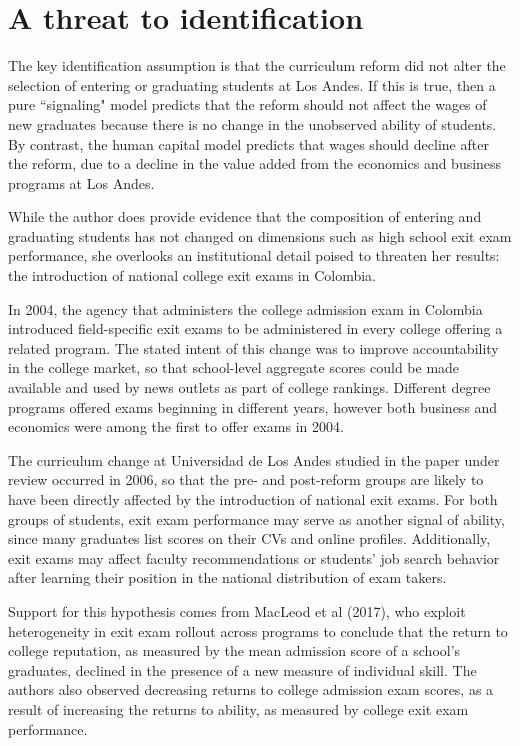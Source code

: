 \documentclass[a4paper, 11pt]{article}
\begin{document}
\section*{A threat to identification}

The key identification assumption is that the curriculum reform did not alter the selection of entering or graduating students at Los Andes.  If this is true, then a pure ``signaling" model predicts that the reform should not affect the wages of new graduates because there is no change in the unobserved ability of students.  By contrast, the human capital model predicts that wages should decline after the reform, due to a decline in the value added from the economics and business programs at Los Andes. 

While the author does provide evidence that the composition of entering and graduating students has not changed on dimensions such as high school exit exam performance, she overlooks an institutional detail poised to threaten her results: the introduction of national college exit exams in Colombia.

In 2004, the agency that administers the college admission exam in Colombia introduced field-specific exit exams to be administered in every college offering a related program.  The stated intent of this change was to improve accountability in the college market, so that school-level aggregate scores could be made available and used by news outlets as part of college rankings.  Different degree programs offered exams beginning in different years, however both business and economics were among the first to offer exams in 2004. 

The curriculum change at Universidad de Los Andes studied in the paper under review occurred in 2006, so that the pre- and post-reform groups are likely to have been directly affected by the introduction of national exit exams.  For both groups of students, exit exam performance may serve as another signal of ability, since many graduates list scores on their CVs and online profiles.  Additionally, exit exams may affect faculty recommendations or students' job search behavior after learning their position in the national distribution of exam takers.  

Support for this hypothesis comes from MacLeod et al (2017), who exploit heterogeneity in exit exam rollout across programs to conclude that the return to college reputation, as measured by the mean admission score of a school's graduates, declined in the presence of a new measure of individual skill.  The authors also observed decreasing returns to college admission exam scores, as a result of increasing the returns to ability, as measured by college exit exam performance. 
\end{document}

